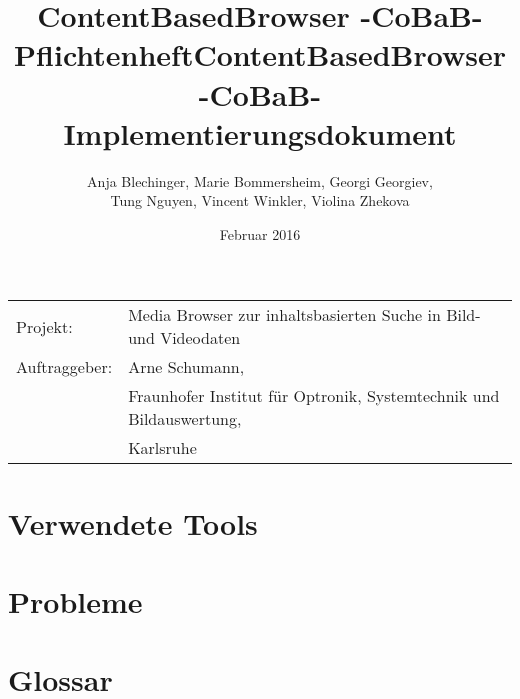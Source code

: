 \documentclass[parskip=full]{scrartcl}
\title{ContentBasedBrowser -CoBaB- \\ Pflichtenheft}
\begin{document}
\begin{titlepage}
\title{ContentBasedBrowser -CoBaB- \\ Implementierungsdokument}
\author{Anja Blechinger, Marie Bommersheim, Georgi Georgiev,\\ Tung Nguyen, Vincent Winkler, Violina Zhekova}
\date{Februar 2016}
\maketitle
\vspace{300pt}
\begin{tabular}{l l}
Projekt: & Media Browser zur inhaltsbasierten Suche in Bild- und Videodaten\\
Auftraggeber: & Arne Schumann,\\
 & Fraunhofer Institut für Optronik, Systemtechnik und Bildauswertung,\\
 & Karlsruhe\\
\end{tabular}
\thispagestyle{empty}
\end{titlepage}
\setcounter{page}{1}

\tableofcontents
\pagebreak

\section{Verwendete Tools}


\section{Probleme}


\section{Glossar}
\printglossaries
\end{document}
